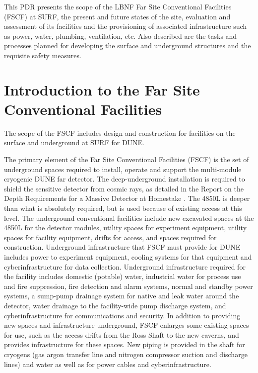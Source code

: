 This PDR presents the scope of the LBNF Far Site Conventional Facilities (FSCF) at SURF, the present and future states of the site, evaluation and assessment of its facilities and the %
provisioning of associated infrastructure such as power, water, plumbing, ventilation, etc. Also described are the  %
tasks and processes planned for developing the surface and underground structures and the requisite safety measures. 


\section{Introduction to the Far Site Conventional Facilities}
\label{sec:fs-facil-cf}

The scope of the FSCF includes design and construction for facilities on the surface and underground at SURF for DUNE. 

The %
primary element of the Far Site Conventional Facilities (FSCF) is the set of underground spaces required to install, operate and support the multi-module cryogenic DUNE far detector. 
The deep-underground installation is required to shield the sensitive detector from cosmic rays, as detailed in the Report on the Depth Requirements for a Massive Detector at Homestake . The 4850L is deeper than what is absolutely required, but is used because of existing access at this level. 
%
The underground conventional facilities include new excavated spaces at the 4850L for the detector modules, utility spaces for experiment equipment, utility spaces for facility equipment, drifts for access, and spaces required for construction. Underground infrastructure that FSCF must provide for DUNE includes power to experiment equipment, cooling systems for that equipment and cyberinfrastructure for data collection. Underground infrastructure %
required for the facility includes domestic (potable) water, industrial water for process use and fire suppression, fire detection and alarm systems, normal and standby power systems, a sump-pump drainage system for native and leak water around the detector, water drainage to the facility-wide pump discharge system, and cyberinfrastructure for communications and security. In addition to providing new spaces and infrastructure underground, FSCF enlarges some existing spaces for use, such as the access drifts from the Ross Shaft to the new caverns, and provides infrastructure for these spaces. New piping is provided in the shaft for cryogens (gas argon transfer line and nitrogen compressor suction and discharge lines) and water as well as for power cables and cyberinfrastructure. 

